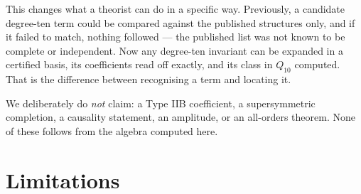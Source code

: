 \documentclass[11pt,a4paper]{article}
\begin{document}
This changes what a theorist can do in a specific way. Previously, a candidate
degree-ten term could be compared against the published structures only, and if
it failed to match, nothing followed --- the published list was not known to be
complete or independent. Now any degree-ten invariant can be expanded in a
certified basis, its coefficients read off exactly, and its class in $Q_{10}$
computed. That is the difference between recognising a term and locating it.

We deliberately do \emph{not} claim: a Type IIB coefficient, a supersymmetric
completion, a causality statement, an amplitude, or an all-orders theorem. None
of these follows from the algebra computed here.

\section{Limitations}
\label{sec:limitations}
\end{document}

